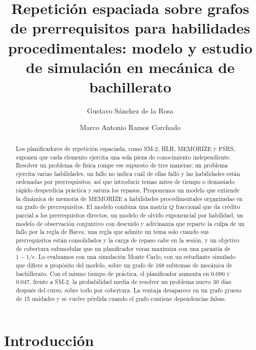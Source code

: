 \documentclass[runningheads]{llncs}
\begin{document}
%
\title{Repetición espaciada sobre grafos de prerrequisitos para habilidades procedimentales: modelo y estudio de simulación en mecánica de bachillerato}
%
%
\author{Gustavo Sánchez de la Rosa \and
Marco Antonio Ramos Corchado}
%
%
%
\maketitle
%
\begin{abstract}
Los planificadores de repetición espaciada, como SM-2, HLR, MEMORIZE y FSRS, suponen que cada elemento ejercita una sola pieza de conocimiento independiente. Resolver un problema de física rompe ese supuesto de tres maneras: un problema ejercita varias habilidades, un fallo no indica cuál de ellas falló y las habilidades están ordenadas por prerrequisitos, así que introducir temas antes de tiempo o demasiado rápido desperdicia práctica y satura los repasos. Proponemos un modelo que extiende la dinámica de memoria de MEMORIZE a habilidades procedimentales organizadas en un grafo de prerrequisitos. El modelo combina una matriz $Q$ fraccional que da crédito parcial a los prerrequisitos directos, un modelo de olvido exponencial por habilidad, un modelo de observación conjuntivo con descuido y adivinanza que reparte la culpa de un fallo por la regla de Bayes, una regla que admite un tema solo cuando sus prerrequisitos están consolidados y la carga de repaso cabe en la sesión, y un objetivo de cobertura submodular que un planificador voraz maximiza con una garantía de $1-1/e$. Lo evaluamos con una simulación Monte Carlo, con un estudiante simulado que difiere a propósito del modelo, sobre un grafo de 168 subtemas de mecánica de bachillerato. Con el mismo tiempo de práctica, el planificador aumenta en 0.090 y 0.047, frente a SM-2, la probabilidad media de resolver un problema nuevo 30 días después del curso, sobre todo por cobertura. La ventaja desaparece en un grafo grueso de 15 unidades y se vuelve pérdida cuando el grafo contiene dependencias falsas.

\end{abstract}

\section{Introducción}
\end{document}
